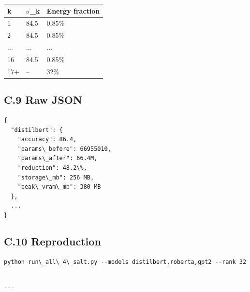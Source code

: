\begin{table}[H]
\centering
\small
\begin{tabular}{lll}
\toprule
\textbf{k} & \textbf{$\sigma$\_k} & \textbf{Energy fraction} \\
\midrule
1 & 84.5 & 0.85\% \\
2 & 84.5 & 0.85\% \\
... & ... & ... \\
16 & 84.5 & 0.85\% \\
17+ & -- & 32\% \\
\bottomrule
\end{tabular}
\end{table}

\subsection{C.9 Raw JSON}

\begin{lstlisting}
{
  "distilbert": {
    "accuracy": 86.4,
    "params\_before": 66955010,
    "params\_after": 66.4M,
    "reduction": 48.2\%,
    "storage\_mb": 256 MB,
    "peak\_vram\_mb": 380 MB
  },
  ...
}
\end{lstlisting}

\subsection{C.10 Reproduction}

\begin{lstlisting}
python run\_all\_4\_salt.py --models distilbert,roberta,gpt2 --rank 32
\end{lstlisting}
\begin{lstlisting}

---
\end{lstlisting}